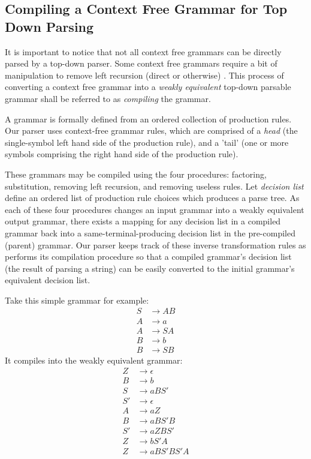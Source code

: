 \documentclass[11pt]{article}
\begin{document}
{\clearpage

\subsection{Compiling a Context Free Grammar for Top Down Parsing}

It is important to notice that not all context free grammars can be directly parsed by a
top-down parser. Some context free grammars require a bit of manipulation to remove
left recursion (direct or otherwise) \cite{compiler}. This process of converting a context
free grammar into a {\em weakly equivalent} top-down parsable grammar shall be referred to as
{\em compiling} the grammar.

A grammar is formally defined from an ordered collection of production rules.
Our parser uses context-free grammar rules, which are comprised of a
{\em head} (the single-symbol left hand side of the production rule), and a 'tail'
(one or more symbols comprising the right hand side of the production rule).

These grammars may be compiled using the four procedures:
factoring, substitution, removing left recursion, and removing useless
rules. Let {\em decision list} define an ordered list of production rule
choices which produces a parse tree.
As each of these four procedures changes an input grammar into a weakly equivalent 
output grammar, there exists a mapping for any decision list in a compiled grammar
back into a same-terminal-producing decision list in the pre-compiled (parent) grammar.
Our parser keeps track of these inverse transformation rules as performs
its compilation procedure so that a compiled grammar's decision list (the result of
parsing a string) can be easily converted to the initial grammar's equivalent decision list. 

Take this simple grammar for example:
\setcounter{equation}{0}
\begin{align}
S &\rightarrow A B\\
A &\rightarrow a\\
A &\rightarrow S A\\
B &\rightarrow b\\
B &\rightarrow S B
\end{align}
It compiles into the weakly equivalent grammar:
\setcounter{equation}{0}
\begin{align}
Z &\rightarrow \epsilon\\
B &\rightarrow b\\
S &\rightarrow a B S'\\
S' &\rightarrow \epsilon\\
A &\rightarrow a Z\\
B &\rightarrow a B S' B\\
S' &\rightarrow a Z B S'\\
Z &\rightarrow b S' A\\
Z &\rightarrow a B S' B S' A
\end{align}

}
\end{document}
